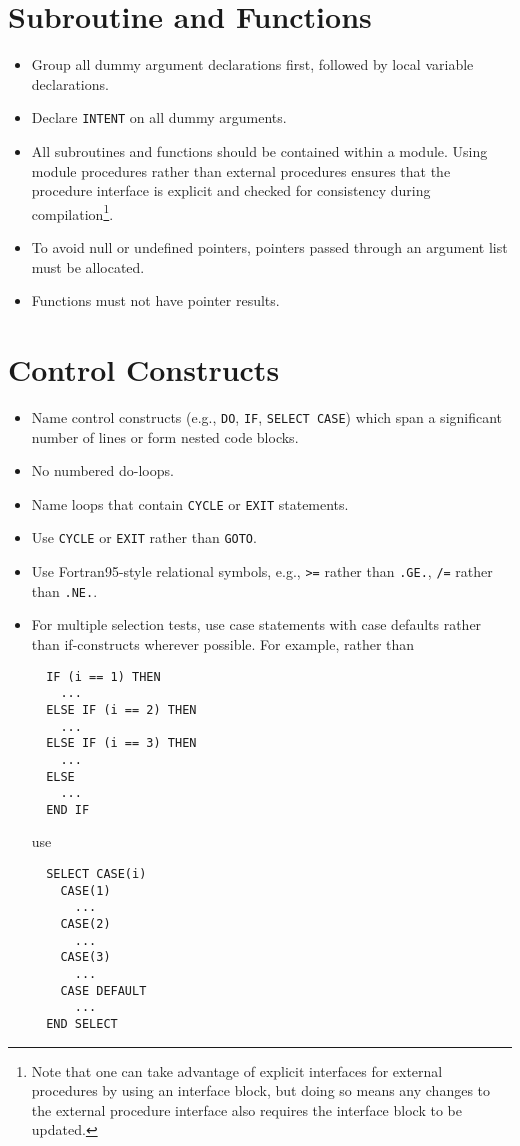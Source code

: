 \section{Subroutine and Functions}
\begin{itemize}
  \item Group all dummy argument declarations first, followed by local variable declarations. 
  \item Declare \texttt{INTENT} on all dummy arguments.
  \item All subroutines and functions should be contained within a module. Using module procedures rather than external procedures ensures that the procedure interface is explicit and checked for consistency during compilation\footnote{Note that one can take advantage of explicit interfaces for external procedures by using an interface block, but doing so means any changes to the external procedure interface also requires the interface block to be updated.}.
  \item To avoid null or undefined pointers, pointers passed through an argument list must be allocated.
  \item Functions must not have pointer results.
\end{itemize}


\section{Control Constructs}
\begin{itemize}
  \item Name control constructs (e.g., \texttt{DO}, \texttt{IF}, \texttt{SELECT CASE}) which span a significant number of lines or form nested code blocks.
  \item No numbered do-loops.
  \item Name loops that contain \texttt{CYCLE} or \texttt{EXIT} statements.
  \item Use \texttt{CYCLE} or \texttt{EXIT} rather than \texttt{GOTO}.
  \item Use Fortran95-style relational symbols, e.g., \texttt{>=} rather than \texttt{.GE.}, \texttt{/=} rather than \texttt{.NE.}. 
  \item For multiple selection tests, use case statements with case defaults rather than if-constructs wherever possible. For example, rather than
  \begin{verbatim}
  IF (i == 1) THEN
    ...
  ELSE IF (i == 2) THEN
    ...
  ELSE IF (i == 3) THEN
    ...
  ELSE
    ...
  END IF\end{verbatim}
use
  \begin{verbatim}
  SELECT CASE(i)
    CASE(1)
      ...
    CASE(2)
      ...
    CASE(3)
      ...
    CASE DEFAULT
      ...
  END SELECT\end{verbatim}
\end{itemize}


